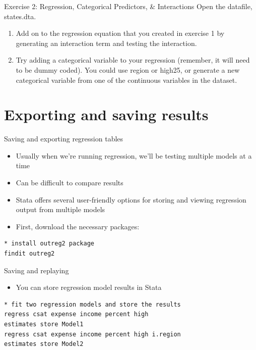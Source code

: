 \documentclass[table,smaller]{beamer}
\begin{document}
\begin{frame}[label=sec-4-5]{Exercise 2: Regression, Categorical Predictors, \& Interactions}
Open the datafile, states.dta.
\begin{enumerate}
\item Add on to the regression equation that you created in exercise 1 by generating an interaction term and testing the interaction.
\item Try adding a categorical variable to your regression (remember, it will need to be dummy coded).  You could use region or high25, or generate a new categorical variable from one of the continuous variables in the dataset.
\end{enumerate}
\end{frame}

\section{Exporting and saving results}
\label{sec-5}

\begin{frame}[fragile,label=sec-5-1]{Saving and exporting regression tables}
 \begin{itemize}
\item Usually when we're running regression, we'll be testing multiple models at a time
\item Can be difficult to compare results
\item Stata offers several user-friendly options for storing and viewing regression output from multiple models
\item First, download the necessary packages:
\end{itemize}


\begin{verbatim}
* install outreg2 package
findit outreg2
\end{verbatim}
\end{frame}

\begin{frame}[fragile,label=sec-5-2]{Saving and replaying}
 \begin{itemize}
\item You can store regression model results in Stata
\end{itemize}


\begin{verbatim}
* fit two regression models and store the results
regress csat expense income percent high
estimates store Model1
regress csat expense income percent high i.region
estimates store Model2
\end{verbatim}
\end{frame}
\end{document}
